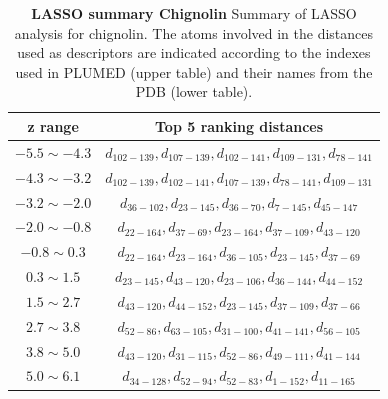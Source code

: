             \begin {table}[h!]
                \caption {\textbf{LASSO summary Chignolin} Summary of LASSO analysis for chignolin. The atoms involved in the distances used as descriptors are indicated according to the indexes used in PLUMED (upper table) and their names from the PDB (lower table).} \label{sup_tab:chignolin_lasso}
                \begin{center}
                \begin{tabular}{ |c|c| } 
                 \hline
                 z range & Top 5 ranking distances \\ 
                 \hline
                    $-5.5\sim -4.3$  & $d_{102-139},d_{107-139},d_{102-141},d_{109-131},d_{78-141}$\\
                    $-4.3\sim -3.2$ & $d_{102-139},d_{102-141},d_{107-139},d_{78-141},d_{109-131}$\\
                    $-3.2\sim -2.0$  &$d_{36-102},d_{23-145},d_{36-70},d_{7-145},d_{45-147}$\\
                    $-2.0\sim -0.8$  &$d_{22-164},d_{37-69},d_{23-164},d_{37-109},d_{43-120}$\\
                    $-0.8\sim 0.3$ &   $d_{22-164},d_{23-164},d_{36-105},d_{23-145},d_{37-69}$\\
                    $0.3\sim 1.5$  &  $d_{23-145},d_{43-120},d_{23-106},d_{36-144},d_{44-152}$\\
                    $1.5\sim 2.7$ &$d_{43-120},d_{44-152},d_{23-145},d_{37-109},d_{37-66}$\\
                    $2.7\sim 3.8$&  $d_{52-86},d_{63-105},d_{31-100},d_{41-141},d_{56-105}$\\
                    $3.8\sim 5.0$ &   $d_{43-120},d_{31-115},d_{52-86},d_{49-111},d_{41-144}$\\
                    $5.0\sim 6.1$& $d_{34-128},d_{52-94},d_{52-83},d_{1-152},d_{11-165}$\\
                 \hline
                \end{tabular}
                
                \vspace{8mm}
                

\end{center}
\end{table}
